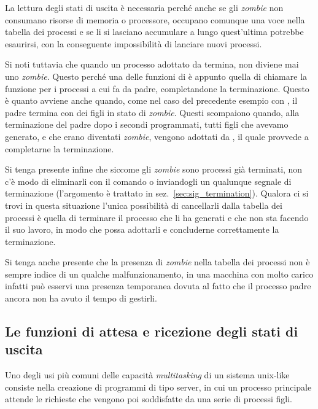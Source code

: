 La lettura degli stati di uscita è necessaria perché anche se gli
\textit{zombie} non consumano risorse di memoria o processore, occupano
comunque una voce nella tabella dei processi e se li si lasciano accumulare a
lungo quest'ultima potrebbe esaurirsi, con la conseguente impossibilità di
lanciare nuovi processi.

Si noti tuttavia che quando un processo adottato da  termina, non
diviene mai uno \textit{zombie}. Questo perché una delle funzioni di
 è appunto quella di chiamare la funzione  per i processi
a cui fa da padre, completandone la terminazione. Questo è quanto avviene
anche quando, come nel caso del precedente esempio con , il
padre termina con dei figli in stato di \textit{zombie}. Questi scompaiono
quando, alla terminazione del padre dopo i secondi programmati, tutti figli
che avevamo generato, e che erano diventati \textit{zombie}, vengono adottati
da , il quale provvede a completarne la terminazione.

Si tenga presente infine che siccome gli \textit{zombie} sono processi già
terminati, non c'è modo di eliminarli con il comando  o inviandogli
un qualunque segnale di terminazione (l'argomento è trattato in
sez.~\ref{sec:sig_termination}). Qualora ci si trovi in questa situazione
l'unica possibilità di cancellarli dalla tabella dei processi è quella di
terminare il processo che li ha generati e che non sta facendo il suo lavoro,
in modo che  possa adottarli e concluderne correttamente la
terminazione.

Si tenga anche presente che la presenza di \textit{zombie} nella tabella dei
processi non è sempre indice di un qualche malfunzionamento, in una macchina
con molto carico infatti può esservi una presenza temporanea dovuta al fatto
che il processo padre ancora non ha avuto il tempo di gestirli. 



\subsection{Le funzioni di attesa e ricezione degli stati di uscita}
\label{sec:proc_wait}

Uno degli usi più comuni delle capacità \textit{multitasking} di un sistema
unix-like consiste nella creazione di programmi di tipo server, in cui un
processo principale attende le richieste che vengono poi soddisfatte da una
serie di processi figli.

